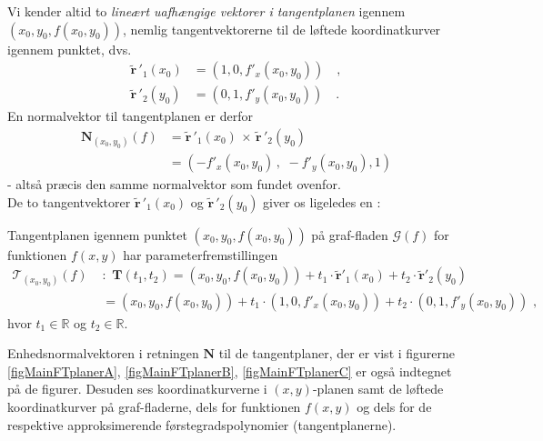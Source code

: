 Vi kender altid to \emph{lineært uafhængige vektorer i tangentplanen} igennem $(x_{0}, y_{0}, f(x_{0}, y_{0}))$, nemlig tangentvektorerne  til de løftede koordinatkurver igennem punktet, dvs.
\begin{equation}
\begin{aligned}
\widetilde{\mathbf{r}}\,'_{1}(x_{0}) &= (1, 0, f'_{x}(x_{0}, y_{0})) \quad , \\
\widetilde{\mathbf{r}}\,'_{2}(y_{0}) &= (0, 1, f'_{y}(x_{0}, y_{0})) \quad .
\end{aligned}
\end{equation}
En normalvektor til tangentplanen er derfor
\begin{equation}
\begin{aligned}
\mathbf{N}_{(x_{0}, y_{0})}(f) &= \widetilde{\mathbf{r}}\,'_{1}(x_{0})\, \times \,\widetilde{\mathbf{r}}\,'_{2}(y_{0}) \\
&= (- f'_{x}(x_{0}, y_{0})\, , \, \, -f'_{y}(x_{0}, y_{0}), 1 )
\end{aligned}
\end{equation}
- altså præcis den samme normalvektor som fundet ovenfor. \\


De to tangentvektorer $\widetilde{\mathbf{r}}\,'_{1}(x_{0})$ og  $\widetilde{\mathbf{r}}\,'_{2}(y_{0})$ giver os ligeledes en  :

\begin{theorem}
Tangentplanen igennem punktet $(x_{0}, y_{0}, f(x_{0}, y_{0}))$ på graf-fladen $\mathcal{G}(f)$ for funktionen $f(x,y)$ har parameterfremstillingen
\begin{equation}
\begin{aligned}
\mathcal{T}_{(x_{0}, y_{0})}(f) \, \,&: \, \, \mathbf{T}(t_{1}, t_{2}) = (x_{0}, y_{0}, f(x_{0}, y_{0})) + t_{1}\cdot \widetilde{\mathbf{r}}'_{1}(x_{0}) + t_{2}\cdot \widetilde{\mathbf{r}}'_{2}(y_{0}) \\
&= (x_{0}, y_{0}, f(x_{0}, y_{0}))+ t_{1}\cdot(1, 0, f'_{x}(x_{0}, y_{0})) +   t_{2}\cdot (0, 1, f'_{y}(x_{0}, y_{0})) \, \, ,
\end{aligned}
\end{equation}
hvor $t_{1} \in \mathbb{R}$ og $t_{2} \in \mathbb{R}$.
\end{theorem}

\begin{example}
Enhedsnormalvektoren i retningen $\mathbf{N}$  til de tangentplaner, der er vist i figurerne \ref{figMainFTplanerA}, \ref{figMainFTplanerB}, \ref{figMainFTplanerC} er også indtegnet på de figurer.
Desuden ses koordinatkurverne i $(x,y)$-planen samt de løftede koordinatkurver på graf-fladerne, dels for funktionen $f(x,y)$ og dels for de respektive
approksimerende førstegradspolynomier (tangentplanerne).
\end{example}

